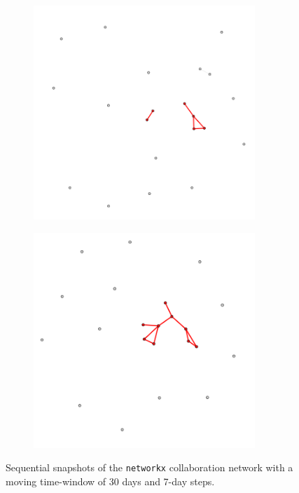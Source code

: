 \begin{figure}
\begin{subfigure}{0.3\textwidth}
        \caption{}
        \label{fig:temporal net D}
    \end{subfigure}
    \hfill
    \begin{subfigure}{0.3\textwidth}
        \centering
        \includegraphics[width=0.92\textwidth]{figures/temporal/4.png}
        \caption{}
        \label{fig:temporal net E}
    \end{subfigure}
    \hfill
    \begin{subfigure}{0.3\textwidth}
        \centering
        \includegraphics[width=0.92\textwidth]{figures/temporal/5.png}
        \caption{}
        \label{fig:temporal net F}
    \end{subfigure}
    \caption{Sequential snapshots of the \texttt{networkx} collaboration network with a moving time-window of 30 days and 7-day steps.}
    \label{fig:temporal net}
\end{figure}

